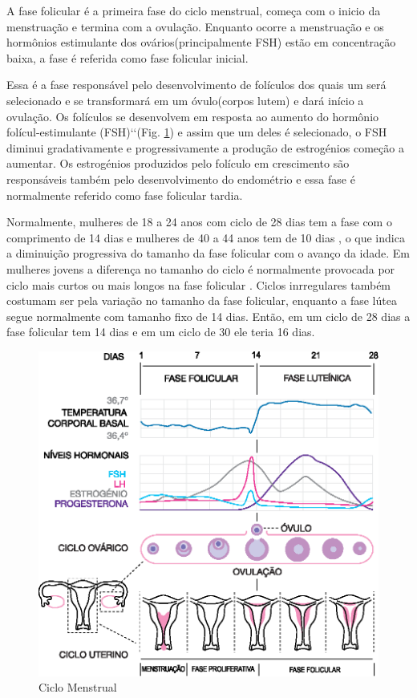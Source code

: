 A fase folicular é a primeira fase do ciclo menstrual, começa com o inicio da menstruação e termina com a ovulação. Enquanto ocorre a menstruação e os hormônios estimulante dos ovários(principalmente FSH) estão em concentração baixa, a fase é referida como fase folicular inicial.

Essa é a fase responsável pelo desenvolvimento de folículos dos quais um será selecionado e se transformará em um óvulo(corpos lutem) e dará início a ovulação. Os folículos se desenvolvem em resposta ao aumento do hormônio folícul-estimulante (FSH)\lq\lq (Fig. \ref{fig01})  e assim que um deles é selecionado, o FSH diminui gradativamente e progressivamente a produção de estrogénios começão a aumentar. Os estrogénios produzidos pelo folículo em crescimento são responsáveis também pelo desenvolvimento do endométrio e essa fase é normalmente referido como fase folicular tardia.

Normalmente, mulheres de 18 a 24 anos com ciclo de 28 dias tem a fase com o comprimento de 14 dias e mulheres de 40 a 44 anos tem de 10 dias \cite{lenton1984a}, o que indica a diminuição progressiva do tamanho da fase folicular com o avanço da idade. Em mulheres jovens a diferença no tamanho do ciclo é normalmente provocada por ciclo mais curtos ou mais longos na fase folicular \cite{lenton1984a}. Ciclos inrregulares também costumam ser pela variação no tamanho da fase folicular, enquanto a fase lútea segue normalmente com tamanho fixo de 14 dias. Então, em um ciclo de 28 dias a fase folicular tem 14 dias e em um ciclo de 30 ele teria 16 dias.

\begin{figure}[h]
	\centering
	\includegraphics[keepaspectratio=true,scale=0.8]{figuras/MenstrualCycle2_pt.eps}
	\caption{Ciclo Menstrual}
        \label{fig01}
\end{figure}

